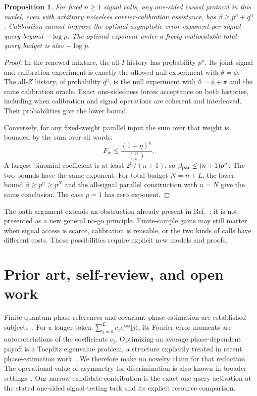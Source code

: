 \documentclass[11pt,a4paper]{article}
\newtheorem{proposition}{Proposition}
\newcommand{\ket}[1]{|#1\rangle}
\begin{document}
\begin{proposition}\label{exponent}
For fixed $n\geq1$ signal calls, any one-sided causal protocol in this model, even with arbitrary noiseless carrier-calibration assistance, has $\beta\geq p^n+q^n$. Calibration cannot improve the optimal asymptotic error exponent per signal query beyond $-\log p$. The optimal exponent under a freely reallocatable total-query budget is also $-\log p$.
\end{proposition}
\begin{proof}
In the renewed mixture, the all-$I$ history has probability $p^n$. Its joint signal and calibration experiment is exactly the allowed null experiment with $\theta=\phi$. The all-$Z$ history, of probability $q^n$, is the null experiment with $\theta=\phi+\pi$ and the same calibration oracle. Exact one-sidedness forces acceptance on both histories, including when calibration and signal operations are coherent and interleaved. Their probabilities give the lower bound.

Conversely, for any fixed-weight parallel input the sum over that weight is bounded by the sum over all words:
\[
 F_w\leq\frac{(1+\eta)^n}{\binom nw}.
\]
A largest binomial coefficient is at least $2^n/(n+1)$, so $\beta_{\rm par}\leq(n+1)p^n$. The two bounds have the same exponent. For total budget $N=n+L$, the lower bound $\beta\geq p^n\geq p^N$ and the all-signal parallel construction with $n=N$ give the same conclusion. The case $p=1$ has zero exponent.
\end{proof}
The path argument extends an obstruction already present in Ref.~\cite{prior}; it is not presented as a new general no-go principle. Finite-sample gains may still matter when signal access is scarce, calibration is reusable, or the two kinds of calls have different costs. Those possibilities require explicit new models and proofs.

\section{Prior art, self-review, and open work}
Finite quantum phase references and covariant phase estimation are established subjects~\cite{buzek,bartlett}. For a longer token $\sum_{j=0}^{L}c_je^{ij\phi}\ket j$, its Fourier error moments are autocorrelations of the coefficients $c_j$. Optimizing an average phase-dependent payoff is a Toeplitz eigenvalue problem, a structure explicitly treated in recent phase-estimation work~\cite{smith,qian}. We therefore make no novelty claim for that reduction. The operational value of asymmetry for discrimination is also known in broader settings~\cite{piani}. Our narrow candidate contribution is the exact one-query activation at the stated one-sided signal-testing task and its explicit resource comparison.
\end{document}
